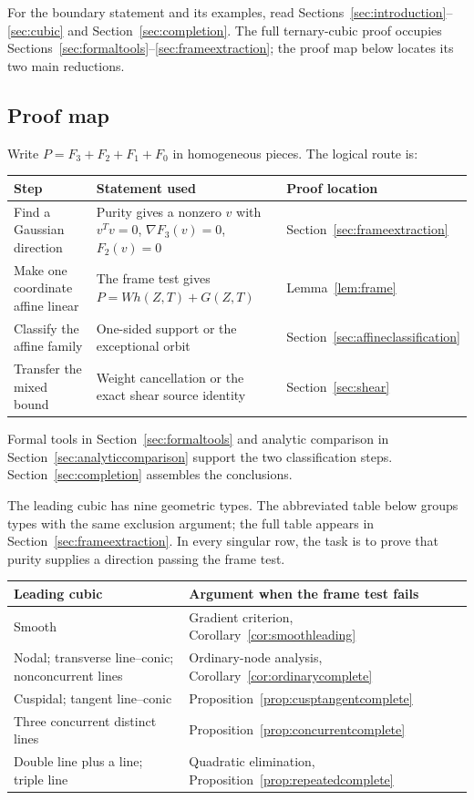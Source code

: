 \documentclass[11pt]{article}
\theoremstyle{definition}\newtheorem{definition}[theorem]{Definition}
\theoremstyle{remark}\newtheorem{remark}[theorem]{Remark}
\begin{document}
For the boundary statement and its examples, read
Sections~\ref{sec:introduction}--\ref{sec:cubic} and
Section~\ref{sec:completion}. The full ternary-cubic proof occupies
Sections~\ref{sec:formaltools}--\ref{sec:frameextraction}; the proof map
below locates its two main reductions.

\subsection*{Proof map}
Write $P=F_3+F_2+F_1+F_0$ in homogeneous pieces. The logical route is:
\begin{center}\small
\begin{tabular}{@{}p{}p{}p{}@{}}
\toprule
Step & Statement used & Proof location\\
\midrule
Find a Gaussian direction & Purity gives a nonzero $v$ with
$v^Tv=0$, $\nabla F_3(v)=0$, $F_2(v)=0$ &
Section~\ref{sec:frameextraction}\\[4pt]
Make one coordinate affine linear & The frame test gives $P=Wh(Z,T)+G(Z,T)$ &
Lemma~\ref{lem:frame}\\[4pt]
Classify the affine family & One-sided support or the exceptional orbit &
Section~\ref{sec:affineclassification}\\[4pt]
Transfer the mixed bound & Weight cancellation or the exact shear source identity &
Section~\ref{sec:shear}\\
\bottomrule
\end{tabular}
\end{center}
Formal tools in Section~\ref{sec:formaltools} and analytic comparison
in Section~\ref{sec:analyticcomparison} support the two classification
steps. Section~\ref{sec:completion} assembles the conclusions.

The leading cubic has nine geometric types. The abbreviated table
below groups types with the same exclusion argument; the full table
appears in Section~\ref{sec:frameextraction}. In every singular row,
the task is to prove that purity supplies a direction passing the
frame test.
\begin{center}\small
\begin{tabular}{@{}p{}p{}@{}}
\toprule
Leading cubic & Argument when the frame test fails\\
\midrule
Smooth & Gradient criterion, Corollary~\ref{cor:smoothleading}\\[3pt]
Nodal; transverse line--conic; nonconcurrent lines &
Ordinary-node analysis, Corollary~\ref{cor:ordinarycomplete}\\[3pt]
Cuspidal; tangent line--conic &
Proposition~\ref{prop:cusptangentcomplete}\\[3pt]
Three concurrent distinct lines &
Proposition~\ref{prop:concurrentcomplete}\\[3pt]
Double line plus a line; triple line &
Quadratic elimination, Proposition~\ref{prop:repeatedcomplete}\\
\bottomrule
\end{tabular}
\end{center}
\end{document}
